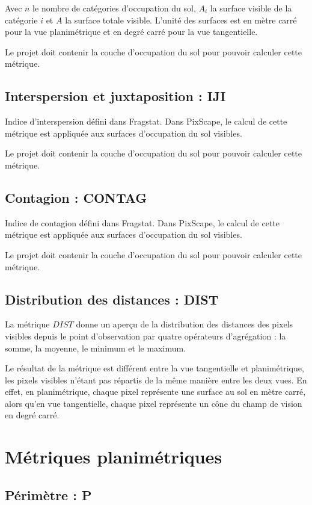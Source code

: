 \documentclass{report}
\begin{document}
Avec $n$ le nombre de catégories d'occupation du sol, $A_i$ la surface visible de la catégorie $i$ et $A$ la surface totale visible. L'unité des surfaces est en mètre carré pour la vue planimétrique et en degré carré pour la vue tangentielle.

Le projet doit contenir la couche d'occupation du sol pour pouvoir calculer cette métrique.

\subsection{Interspersion et juxtaposition : IJI}
Indice d'interspersion défini dans Fragstat. Dans PixScape, le calcul de cette métrique est appliquée aux surfaces d'occupation du sol visibles.

Le projet doit contenir la couche d'occupation du sol pour pouvoir calculer cette métrique.

\subsection{Contagion : CONTAG}
Indice de contagion défini dans Fragstat. Dans PixScape, le calcul de cette métrique est appliquée aux surfaces d'occupation du sol visibles.

Le projet doit contenir la couche d'occupation du sol pour pouvoir calculer cette métrique.

\subsection{Distribution des distances : DIST}

La métrique $DIST$ donne un aperçu de la distribution des distances des pixels visibles depuis le point d'observation par quatre opérateurs d'agrégation : la somme, la moyenne, le minimum et le maximum.

Le résultat de la métrique est différent entre la vue tangentielle et planimétrique, les pixels visibles n'étant pas répartis de la même manière entre les deux vues. En effet, en planimétrique, chaque pixel représente une surface au sol en mètre carré, alors qu'en vue tangentielle, chaque pixel représente un cône du champ de vision en degré carré.


\section{Métriques planimétriques}

\subsection{Périmètre : P}
\end{document}
